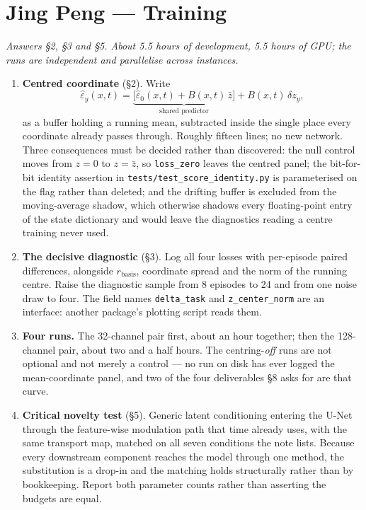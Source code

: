 \documentclass[11pt]{article}
\newcommand{\code}[1]{\texttt{\small #1}}
\begin{document}
\section{Jing Peng --- Training}

\noindent\emph{Answers \S2, \S3 and \S5. About 5.5 hours of development, 5.5 hours of GPU;
the runs are independent and parallelise across instances.}

\begin{enumerate}
  \item \textbf{Centred coordinate} (\S2). Write
    \[
      \hat\varepsilon_y(x,t)
      = \underbrace{\big[\hat\varepsilon_0(x,t) + B(x,t)\,\bar z\big]}_{\text{shared predictor}}
      + B(x,t)\,\delta z_y ,
    \]
    as a buffer holding a running mean, subtracted inside the single place every
    coordinate already passes through. Roughly fifteen lines; no new network. Three
    consequences must be decided rather than discovered: the null control moves from
    $z=0$ to $z=\bar z$, so \code{loss\_zero} leaves the centred panel; the bit-for-bit
    identity assertion in \code{tests/test\_score\_identity.py} is parameterised on the
    flag rather than deleted; and the drifting buffer is excluded from the
    moving-average shadow, which otherwise shadows every floating-point entry of the
    state dictionary and would leave the diagnostics reading a centre training never used.
  \item \textbf{The decisive diagnostic} (\S3). Log all four losses with per-episode paired
    differences, alongside $r_{\mathrm{basis}}$, coordinate spread and the norm of the
    running centre. Raise the diagnostic sample from 8 episodes to 24 and from one noise
    draw to four. The field names \code{delta\_task} and \code{z\_center\_norm} are an
    interface: another package's plotting script reads them.
  \item \textbf{Four runs.} The 32-channel pair first, about an hour together; then the
    128-channel pair, about two and a half hours. The centring-\emph{off} runs are not
    optional and not merely a control --- no run on disk has ever logged the
    mean-coordinate panel, and two of the four deliverables \S8 asks for are that curve.
  \item \textbf{Critical novelty test} (\S5). Generic latent conditioning entering the
    U-Net through the feature-wise modulation path that time already uses, with the same
    transport map, matched on all seven conditions the note lists. Because every
    downstream component reaches the model through one method, the substitution is a
    drop-in and the matching holds structurally rather than by bookkeeping. Report both
    parameter counts rather than asserting the budgets are equal.
\end{enumerate}
\end{document}
